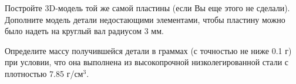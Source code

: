 
Постройте 3D-модель той же самой пластины (если Вы еще этого не сделали).   Дополните модель детали недостающими элементами,  чтобы пластину можно было надеть на круглый вал радиусом 3 мм.


Определите массу получившейся детали в граммах (с точностью не ниже 0.1 г) при условии, что она выполнена из высокопрочной низколегированной стали с плотностью 7.85 г/см$^3$.

